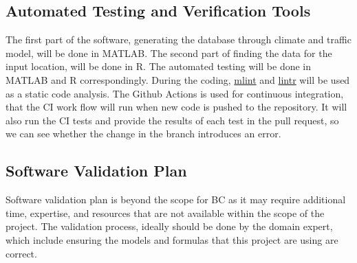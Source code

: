 \documentclass[12pt, titlepage]{article}
\begin{document}

\subsection{Automated Testing and Verification Tools}\label{ATVT}
The first part of the software, generating the database through climate and traffic model, will be done in MATLAB. The second part of finding the data for the input location, will be done in R. The automated testing will be done in MATLAB and R correspondingly. During the coding, \href{https://www.mathworks.com/help/matlab/ref/mlint.html}{mlint} and \href{https://lintr.r-lib.org/}{lintr} will be used as a static code analysis. The Github Actions is used for continuous integration, that the CI work flow will run when new code is pushed to the repository. It will also run the CI tests and provide the results of each test in the pull request, so we can see whether the change in the branch introduces an error.



\subsection{Software Validation Plan}\label{SVP}
Software validation plan is beyond the scope for BC as it may require additional time, expertise, and resources that are not available within the scope of the project. The validation process, ideally should be done by the domain expert, which include ensuring the models and formulas that this project are using are correct.
\end{document}
